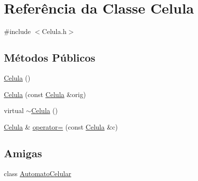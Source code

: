 \hypertarget{class_celula}{
\section{Referência da Classe Celula}
\label{class_celula}
}


{\ttfamily \#include $<$Celula.h$>$}

\subsection*{Métodos Públicos}
\begin{DoxyCompactItemize}
\item 
\hyperlink{class_celula_a3c5017fbcec8cb564acc666aa7e21206}{Celula} ()
\item 
\hyperlink{class_celula_a63d34f448ef29a7d14c55d3c1d324245}{Celula} (const \hyperlink{class_celula}{Celula} \&orig)
\item 
virtual \hyperlink{class_celula_aa102b024e4c8d91a2f69afa14d4e4130}{$\sim$Celula} ()
\item 
\hyperlink{class_celula}{Celula} \& \hyperlink{class_celula_a376634f1f53256f52a3a53e385d92195}{operator=} (const \hyperlink{class_celula}{Celula} \&c)
\end{DoxyCompactItemize}
\subsection*{Amigas}
\begin{DoxyCompactItemize}
\item 
class \hyperlink{class_celula_a6e5b914f395a9ce47844104b9b750dde}{AutomatoCelular}
\end{DoxyCompactItemize}


